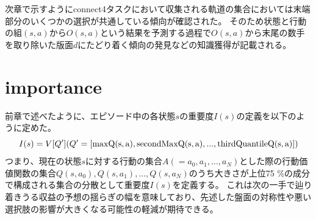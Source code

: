 次章で示すようにconnect4タスクにおいて収集される軌道の集合においては末端部分のいくつかの選択が共通している傾向が確認された。
そのため状態と行動の組$(s, a)$から$O(s, a)$という結果を予測する過程で$O(s, a)$から末尾の数手を取り除いた版面$d$にたどり着く傾向の発見などの知識獲得が記載される。
\section{importance}
前章で述べたように、エピソード中の各状態$s$の重要度$I(s)$の定義を以下のように定めた。
\begin{equation}
	{I(s)=V[Q'] (Q'=[\rm{max}Q(s, a), \rm{secondMax}Q(s, a), ..., \rm{thirdQuantile}Q(s, a)])}
\end{equation}
つまり、現在の状態$s$に対する行動の集合$A(={a_0, a_1, ..., a_N})$とした際の行動価値関数の集合${Q(s, a_0), Q(s, a_1), ..., Q(s, a_N)}$のうち大きさが上位75
\%の成分で構成される集合の分散として重要度$I(s)$を定義する。
これは次の一手で辿り着きうる収益の予想の揺らぎの幅を意味しており、先述した盤面の対称性や悪い選択肢の影響が大きくなる可能性の軽減が期待できる。

